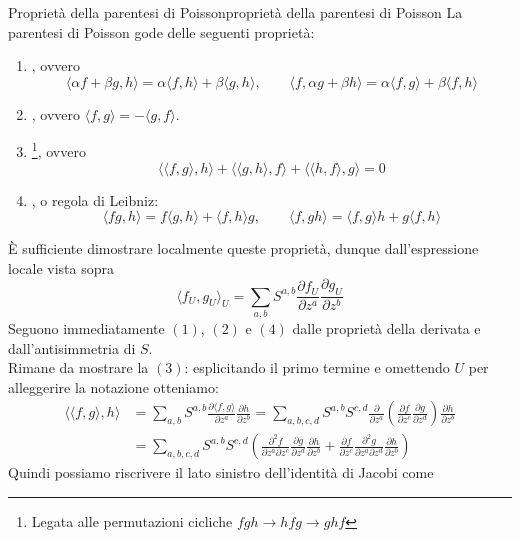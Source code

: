\documentclass[openany]{book}
\begin{document}
\begin{proposition}{Proprietà della parentesi di Poisson}{proprietà della parentesi di Poisson}
    La parentesi di Poisson gode delle seguenti proprietà:\begin{enumerate}
        \item {}, ovvero 
        \[ \langle \alpha f + \beta g, h \rangle = \alpha\langle f,h \rangle+\beta \langle g, h\rangle,\qquad \langle f, \alpha g + \beta h \rangle = \alpha\langle f,g\rangle + \beta\langle f, h\rangle \]
        \item {}, ovvero $\langle f,g\rangle = - \langle g, f\rangle$.
        \item {}\footnote{Legata alle permutazioni cicliche $fgh\to hfg \to ghf$}, ovvero 
        \[ \langle\langle f, g \rangle, h\rangle + \langle\langle g,h\rangle,f\rangle + \langle\langle h,f\rangle, g\rangle = 0 \]
        \item {}, o regola di Leibniz:
        \[ \langle fg, h \rangle = f \langle g,h\rangle + \langle f,h\rangle g, \qquad \langle f, gh\rangle = \langle f,g\rangle h + g\langle f,h\rangle \]
    \end{enumerate}
    \proof 
    È sufficiente dimostrare localmente queste proprietà, dunque dall'espressione locale vista sopra 
    \[ \langle f_U, g_U\rangle_U = \sum_{a,b}S^{a,b} \frac{\partial f_U}{\partial z^a} \frac{\partial g_U}{\partial z^b}  \]
    Seguono immediatamente $(1)$, $(2)$ e $(4)$ dalle proprietà della derivata e dall'antisimmetria di $S$.\\
    Rimane da mostrare la $(3)$: esplicitando il primo termine e omettendo $U$ per alleggerire la notazione otteniamo:
    \begin{align*}
        \langle\langle f, g \rangle, h\rangle & = \sum_{a,b}S^{a,b}\frac{\partial \langle f, g \rangle}{\partial z^a}\frac{\partial h}{\partial z^b} = \sum_{a,b,c,d}S^{a,b}S^{c,d}\frac{\partial }{\partial z^a}\left( \frac{\partial f}{\partial z^c}\frac{\partial g}{\partial z^d} \right)\frac{\partial h}{\partial z^b} \\ 
        & = \sum_{a,b,c,d} S^{a,b}S^{c,d}\left( \frac{\partial^2 f}{\partial z^a \partial z^c} \frac{\partial g}{\partial z^d} \frac{\partial h}{\partial z^b} + \frac{\partial f}{\partial z^c}\frac{\partial^2 g}{\partial z^a\partial z^d}\frac{\partial h}{\partial z^b} \right) 
    \end{align*}
    Quindi possiamo riscrivere il lato sinistro dell'identità di Jacobi come 

\end{proposition}
\end{document}
